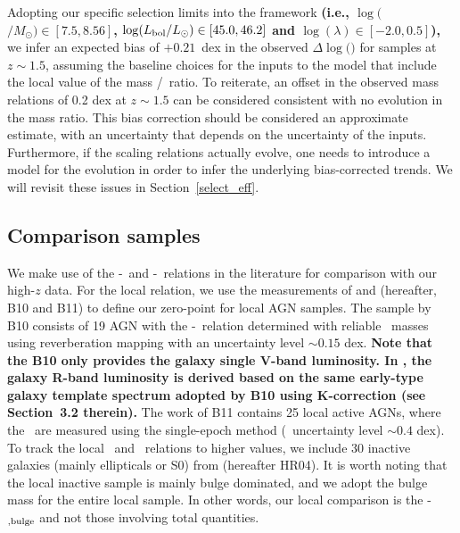 \documentclass[apj]{emulateapj}
\begin{document}
Adopting our specific selection limits into the framework {\bf (i.e., $\log($\mbh$/M_{\odot})\in[7.5, 8.56]$, $\log(L_{\rm bol}/L_{\odot})\in[45.0, 46.2] $ and  $\log(\lambda) \in [-2.0, 0.5]$),} we infer an expected bias of $+0.21$~dex in the observed $\Delta\log($\mbh$)$ for samples at $z\sim1.5$, assuming the baseline choices for the inputs to the model that include the local value of the mass \mbh/\smass ~ratio. To reiterate, an offset in the observed mass relations of 0.2 dex at $z\sim1.5$ can be considered consistent with no evolution in the mass ratio. This bias correction should be considered an approximate estimate, with an uncertainty that depends on the uncertainty of the inputs. Furthermore, if the scaling relations actually evolve, one needs to introduce a model for the evolution in order to infer the underlying bias-corrected trends. We will revisit these issues in Section~\ref{select_eff}.

\subsection{Comparison samples}\label{sec:compare_sample}

We make use of the \mbh-\lhost\ and \mbh-\smass\ relations in the literature for comparison with our high-$z$ data. For the local relation, we use the measurements of \citet{Ben++10} and \citet{Bennert++2011} (hereafter, B10 and B11) to define our zero-point for local AGN samples. The sample by B10 consists of 19 AGN with the \mbh-\lhost\ relation determined with reliable \mbh\ masses using reverberation mapping with an uncertainty level $\sim0.15$ dex. {\bf Note that the B10 only provides the galaxy single V-band luminosity. In \citet{Ding2017b}, the galaxy R-band luminosity is derived based on the same early-type galaxy template spectrum adopted by B10 using K-correction (see Section~3.2 therein).} The work of B11 contains 25 local active AGNs, where the \mbh\ are measured using the single-epoch method (\mbh\ uncertainty level $\sim0.4$ dex). To track the local \smass\ and \mbh\  relations to higher values, we include 30 inactive galaxies (mainly ellipticals or S0) from \citet{H+R04} (hereafter HR04). It is worth noting that the local inactive sample is mainly bulge dominated, and we adopt the bulge mass for the entire local sample. In other words, our local comparison is the \mbh-\smass$_{\rm ,bulge}$ and not those involving total quantities.
\end{document}
